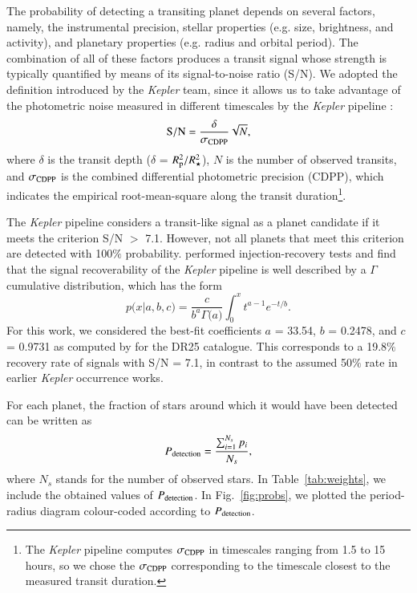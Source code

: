 \documentclass[]{aa}
\begin{document}
The probability of detecting a transiting planet depends on several factors, namely, the instrumental precision, stellar properties (e.g. size, brightness, and activity), and planetary properties (e.g. radius and orbital period). The combination of all of these factors produces a transit signal whose strength is typically quantified by means of its signal-to-noise ratio (S/N). We adopted the definition introduced by the \textit{Kepler} team, since it allows us to take advantage of the photometric noise measured in different timescales by the \textit{Kepler} pipeline \citep{2010ApJ...713L..87J}:
\begin{equation}
    \rm S/N = \frac{\delta}{\sigma_{CDPP}} \sqrt{N},
\end{equation}
where $\delta$ is the transit depth ($\delta$ = $R_{\rm p}^{2} / R_{\star}^{2}$), $N$ is the number of observed transits, and $\sigma_{\rm CDPP}$ is the combined differential photometric precision (CDPP), which indicates the empirical root-mean-square along the transit duration\footnote{The \textit{Kepler} pipeline computes $\sigma_{\rm CDPP}$ in timescales ranging from 1.5 to 15 hours, so we chose the $\sigma_{\rm CDPP}$ corresponding to the timescale closest to the measured transit duration.}. 

The \textit{Kepler} pipeline considers a transit-like signal as a planet candidate if it meets the criterion S/N $>$ 7.1. However, not all planets that meet this criterion are detected with 100$\%$ probability. \citet{2015ApJ...810...95C,2020AJ....160..159C} performed injection-recovery tests and find that the signal recoverability of the \textit{Kepler} pipeline is well described by a $\Gamma$ cumulative distribution, which has the form
\begin{equation}
    p\big(x|a,b,c\big) = \frac{c}{b^{a} \Gamma \big(a\big)} \int_{0}^{x} t^{a-1} e^{-t/b}.
\end{equation}
For this work, we considered the best-fit coefficients $a$ = 33.54, $b$ = 0.2478, and $c$ = 0.9731 as computed by \citet{2020AJ....160..159C} for the DR25 catalogue. This corresponds to a 19.8$\%$ recovery rate of signals with S/N =  7.1, in contrast to the assumed 50$\%$ rate in earlier \textit{Kepler} occurrence works.


For each planet, the fraction of stars around which it would have been detected can be written as
\begin{equation}
    P_{\rm detection} = \frac{\sum_{i=1}^{N_{s}}p_{i}}{N_{s}},
\end{equation}
where $N_{s}$ stands for the number of observed stars. In Table~\ref{tab:weights}, we include the obtained values of $P_{\rm detection}$. In Fig.~\ref{fig:probs}, we plotted the period-radius diagram colour-coded according to $P_{\rm detection}$. 
\end{document}
